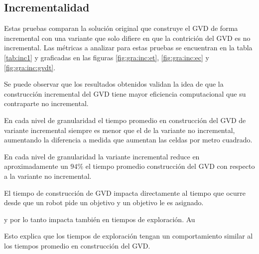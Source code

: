 







\subsection{Incrementalidad}\label{sec:exp:inc}
Estas pruebas comparan la solución original que construye el GVD de forma
incremental con una variante que solo difiere en que la contrición del GVD es
no incremental. Las métricas a analizar para estas pruebas se encuentran en la
tabla \ref{tab:inc1} y graficadas en las figuras \ref{fig:gra:inc:et}, \ref{fig:gra:inc:ec}
y \ref{fig:gra:inc:gvdt}.

Se puede observar que los resultados obtenidos validan la idea de que la
construcción incremental del GVD tiene mayor eficiencia computacional que su
contraparte no incremental. 

En cada nivel de granularidad el tiempo promedio en construcción del GVD de
variante incremental siempre es menor que el de la variante no incremental,
aumentando la diferencia a medida que aumentan las celdas por metro cuadrado.

En cada nivel de granularidad la variante incremental reduce en aproximadamente
un $94\%$ el tiempo promedio construcción del GVD con respecto a la variante no
incremental. 

El tiempo de construcción de GVD impacta directamente al tiempo que ocurre
desde que un robot pide un objetivo y un objetivo le es asignado. 

y por lo tanto
impacta también en tiempos de exploración. Au

Esto explica que los tiempos de exploración tengan un comportamiento similar al
los tiempos promedio en construcción del GVD. 

